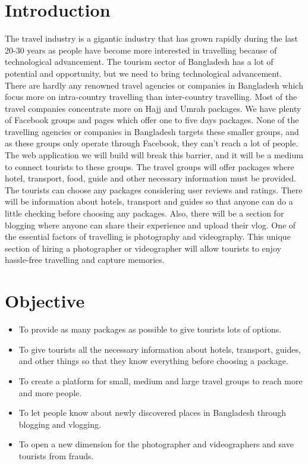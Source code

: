 \documentclass[12pt,a4paper,twoside,openright]{report}
\begin{document}
\newpage
\section*{Introduction}
The travel industry is a gigantic industry that has grown rapidly during the last 20-30 years as people have become more interested in travelling because of technological advancement. The tourism sector of Bangladesh has a lot of potential and opportunity, but we need to bring technological advancement. There are hardly any renowned travel agencies or companies in Bangladesh which focus more on intra-country travelling than inter-country travelling. Most of the travel companies concentrate more on Hajj and Umrah packages. We have plenty of Facebook groups and pages which offer one to five days packages. None of the travelling agencies or companies in Bangladesh targets these smaller groups, and as these groups only operate through Facebook, they can't reach a lot of people. The web application we will build will break this barrier, and it will be a medium to connect tourists to these groups. The travel groups will offer packages where hotel, transport, food, guide and other necessary information must be provided. The tourists can choose any packages considering user reviews and ratings. There will be information about hotels, transport and guides so that anyone can do a little checking before choosing any packages. Also, there will be a section for blogging where anyone can share their experience and upload their vlog. One of the essential factors of travelling is photography and videography. This unique section of hiring a photographer or videographer will allow tourists to enjoy hassle-free travelling and capture memories.
\section*{Objective}
\begin{itemize}
\item To provide as many packages as possible to give tourists lots of options.
\item To give tourists all the necessary information about hotels, transport, guides, and other things so that they know everything before choosing a package.
\item  To create a platform for small, medium and large travel groups to reach more and more people.
\item To let people know about newly discovered places in Bangladesh through blogging and vlogging.
\item To open a new dimension for the photographer and videographers and save tourists from frauds.
\end{itemize}
\newpage
\end{document}
